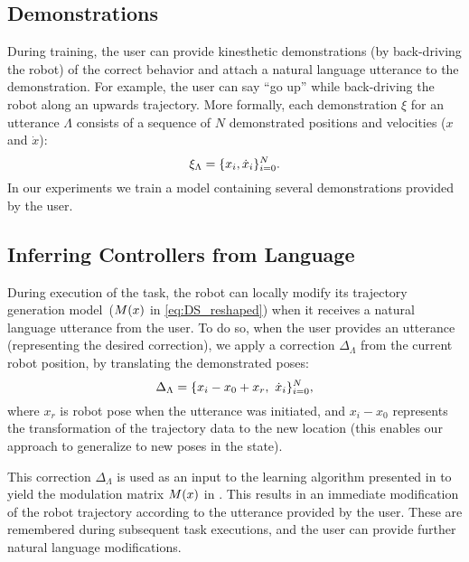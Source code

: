 \subsection{Demonstrations}

During training, the user can provide kinesthetic demonstrations (by back-driving the robot) of the correct behavior and attach a natural language utterance to the demonstration.
For example, the user can say ``go up'' while back-driving the robot along an upwards trajectory.
More formally, each demonstration $\xi$ for an utterance $\Lambda$ consists of a sequence of $N$ demonstrated positions and velocities ($x$ and $\dot{x}$):
\begin{equation}
  \xi_\Lambda = \{ x_i, \dot{x}_i \}_{i=0}^N.
\end{equation}
In our experiments we train a model containing several demonstrations provided by the user.


\subsection{Inferring Controllers from Language}

During execution of the task, the robot can locally modify its trajectory generation model~($M\lparen x\rparen$ in \cref{eq:DS_reshaped}) when it receives a natural language utterance from the user.
To do so, when the user provides an utterance (representing the desired correction), we apply a correction $\Delta_\Lambda$ from the current robot position, by translating the demonstrated poses:
\begin{equation}
  \Delta_\Lambda = \{ x_i - x_0  + x_r, \,\, \dot{x}_i \}_{i=0}^N,
\end{equation}
where $x_r$ is robot pose when the utterance was initiated,
and $x_i-x_0$ represents the transformation of the trajectory data to the new location (this enables our approach to generalize to new poses in the state).

This correction $\Delta_\Lambda$ is used as an input to the learning algorithm presented in \citet{Kronander2015} to yield the modulation matrix $M\lparen x\rparen$ in .
This results in an immediate modification of the robot trajectory according to the utterance provided by the user.
These are remembered during subsequent task executions, and the user can provide further natural language modifications.
